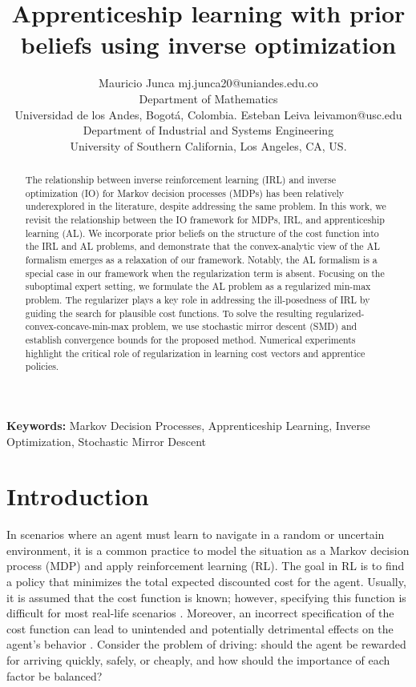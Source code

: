 \documentclass[10pt]{article} %
\title{Apprenticeship learning with prior beliefs using inverse optimization}
\author{ \name Mauricio Junca \email mj.junca20@uniandes.edu.co\\
 \addr Department of Mathematics\\
 Universidad de los Andes, Bogot\'{a}, Colombia.
 \AND
 \name Esteban Leiva \email leivamon@usc.edu\\
 \addr Department of Industrial and Systems Engineering\\
 University of Southern California, Los Angeles, CA, US.}
\begin{document}
\maketitle

\begin{abstract}
 The relationship between inverse reinforcement learning (IRL) and inverse optimization (IO) for Markov decision processes (MDPs) has been relatively underexplored in the literature, despite addressing the same problem. In this work, we revisit the relationship between the IO framework for MDPs, IRL, and apprenticeship learning (AL). We incorporate prior beliefs on the structure of the cost function into the IRL and AL problems, and demonstrate that the convex-analytic view of the AL formalism emerges as a relaxation of our framework. Notably, the AL formalism is a special case in our framework when the regularization term is absent. Focusing on the suboptimal expert setting, we formulate the AL problem as a regularized min-max problem. The regularizer plays a key role in addressing the ill-posedness of IRL by guiding the search for plausible cost functions. To solve the resulting regularized-convex-concave-min-max problem, we use stochastic mirror descent (SMD) and establish convergence bounds for the proposed method. Numerical experiments highlight the critical role of regularization in learning cost vectors and apprentice policies.
\end{abstract}
\textbf{Keywords:} Markov Decision Processes, Apprenticeship Learning, Inverse Optimization, Stochastic Mirror Descent

\section{Introduction} \label{sec:intro}

In scenarios where an agent must learn to navigate in a random or uncertain environment, it is a common practice to model the situation as a Markov decision process (MDP) and apply reinforcement learning (RL). The goal in RL is to find a policy that minimizes the total expected discounted cost for the agent. Usually, it is assumed that the cost function is known; however, specifying this function is difficult for most real-life scenarios \citep{Ng2000}. Moreover, an incorrect specification of the cost function can lead to unintended and potentially detrimental effects on the agent's behavior \citep{Amodei2016, Hadfieldmenell2020}. Consider the problem of driving: should the agent be rewarded for arriving quickly, safely, or cheaply, and how should the importance of each factor be balanced? \par
\end{document}
